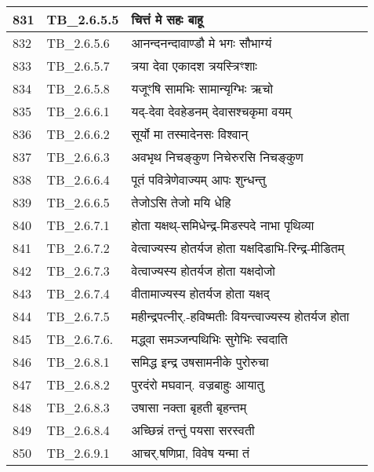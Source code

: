 \documentclass[17pt]{extarticle}
\begin{document}
\begin{longtable}{||p{0.4in}||p{0.9in}||p{4.0in}||p{0.9in}||}
        \hline
            831 & TB\_2.6.5.5 & चित्तं मे सहः बाहू &      \\
        \hline
            832 & TB\_2.6.5.6 & आनन्दनन्दावाण्डौ मे भगः सौभाग्यं &      \\
        \hline
            833 & TB\_2.6.5.7 & त्रया देवा एकादश त्रयस्त्रिꣳशाः &      \\
        \hline
            834 & TB\_2.6.5.8 & यजूꣳषि सामभिः सामान्यृग्भिः ऋचो &      \\
        \hline
            835 & TB\_2.6.6.1 & यद्{-}देवा देवहेडनम् देवासश्चकृमा वयम् &      \\
        \hline
            836 & TB\_2.6.6.2 & सूर्यो मा तस्मादेनसः विश्वान् &      \\
        \hline
            837 & TB\_2.6.6.3 & अवभृथ निचङ्कुण निचेरुरसि निचङ्कुण &      \\
        \hline
            838 & TB\_2.6.6.4 & पूतं पवित्रेणेवाज्यम् आपः शुन्धन्तु &      \\
        \hline
            839 & TB\_2.6.6.5 & तेजोऽसि तेजो मयि धेहि &      \\
        \hline
            840 & TB\_2.6.7.1 & होता यक्षथ्{-}समिधेन्द्र{-}मिडस्पदे नाभा पृथिव्या &      \\
        \hline
            841 & TB\_2.6.7.2 & वेत्वाज्यस्य होतर्यज होता यक्षदिडाभि{-}रिन्द्र{-}मीडितम् &      \\
        \hline
            842 & TB\_2.6.7.3 & वेत्वाज्यस्य होतर्यज होता यक्षदोजो &      \\
        \hline
            843 & TB\_2.6.7.4 & वीतामाज्यस्य होतर्यज होता यक्षद् &      \\
        \hline
            844 & TB\_2.6.7.5 & महीन्द्रपत्नीर्.{-}हविष्मतीः वियन्त्वाज्यस्य होतर्यज होता &      \\
        \hline
            845 & TB\_2.6.7.6. & मद्ध्वा समञ्जन्पथिभिः सुगेभिः स्वदाति &      \\
        \hline
            846 & TB\_2.6.8.1 & समिद्ध इन्द्र उषसामनीके पुरोरुचा &      \\
        \hline
            847 & TB\_2.6.8.2 & पुरदंरो मघवान्. वज्रबाहुः आयातु &      \\
        \hline
            848 & TB\_2.6.8.3 & उषासा नक्ता बृहती बृहन्तम् &      \\
        \hline
            849 & TB\_2.6.8.4 & अच्छिन्नं तन्तुं पयसा सरस्वती &      \\
        \hline
            850 & TB\_2.6.9.1 & आचर्.षणिप्रा, विवेष यन्मा तं &      \\

\end{longtable}
\end{document}

